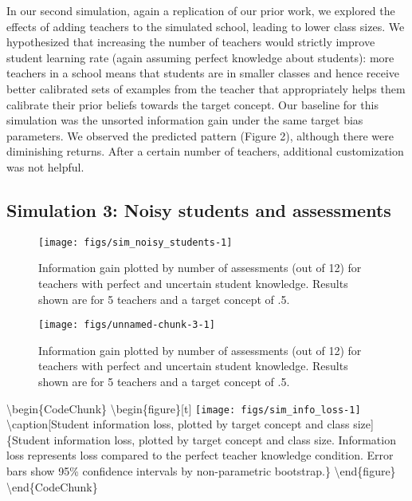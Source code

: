 \documentclass[10pt, letterpaper]{article}
\newenvironment{CodeChunk}{}{}
\begin{document}
In our second simulation, again a replication of our prior work, we
explored the effects of adding teachers to the simulated school, leading
to lower class sizes. We hypothesized that increasing the number of
teachers would strictly improve student learning rate (again assuming
perfect knowledge about students): more teachers in a school means that
students are in smaller classes and hence receive better calibrated sets
of examples from the teacher that appropriately helps them calibrate
their prior beliefs towards the target concept. Our baseline for this
simulation was the unsorted information gain under the same target bias
parameters. We observed the predicted pattern (Figure 2), although there
were diminishing returns. After a certain number of teachers, additional
customization was not helpful.

\subsection{Simulation 3: Noisy students and
assessments}\label{simulation-3-noisy-students-and-assessments}

\begin{CodeChunk}
\begin{figure*}[t]
\texttt{[image: figs/sim\_noisy\_students-1]} \caption[Information gain plotted by number of assessments (out of 12) for teachers with perfect and uncertain student knowledge]{Information gain plotted by number of assessments (out of 12) for teachers with perfect and uncertain student knowledge. Results shown are for 5 teachers and a target concept of .5.}\label{fig:sim_noisy_students}
\end{figure*}
\end{CodeChunk}

\begin{CodeChunk}
\begin{figure}[t]
\texttt{[image: figs/unnamed-chunk-3-1]} \caption[Information gain plotted by number of assessments (out of 12) for teachers with perfect and uncertain student knowledge]{Information gain plotted by number of assessments (out of 12) for teachers with perfect and uncertain student knowledge. Results shown are for 5 teachers and a target concept of .5.}\label{fig:unnamed-chunk-3}
\end{figure}
\end{CodeChunk}

\textbackslash{}begin\{CodeChunk\}
\textbackslash{}begin\{figure\}{[}t{]}
\texttt{[image: figs/sim\_info\_loss-1]}
\textbackslash{}caption{[}Student information loss, plotted by target
concept and class size{]}\{Student information loss, plotted by target
concept and class size. Information loss represents loss compared to the
perfect teacher knowledge condition. Error bars show 95\% confidence
intervals by non-parametric bootstrap.\}\label{fig:sim_info_loss}
\textbackslash{}end\{figure\} \textbackslash{}end\{CodeChunk\}
\end{document}
